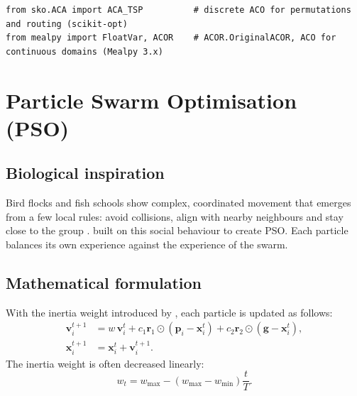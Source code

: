 \documentclass[11pt,a4paper]{article}
\newcommand{\vect}[1]{\mathbf{#1}}
\begin{document}
\begin{lstlisting}
from sko.ACA import ACA_TSP          # discrete ACO for permutations and routing (scikit-opt)
from mealpy import FloatVar, ACOR    # ACOR.OriginalACOR, ACO for continuous domains (Mealpy 3.x)
\end{lstlisting}

\section{Particle Swarm Optimisation (PSO)}
\label{sec:pso}

\subsection{Biological inspiration}

Bird flocks and fish schools show complex, coordinated movement that emerges from a few local rules: avoid collisions, align with nearby neighbours and stay close to the group \citep{reynolds1987}. \citet{kennedy1995} built on this social behaviour to create PSO. Each particle balances its own experience against the experience of the swarm.

\subsection{Mathematical formulation}

With the inertia weight introduced by \citet{shi1998}, each particle is updated as follows:
\begin{align}
  \vect{v}_i^{t+1} &= w \, \vect{v}_i^{t} + c_1 \vect{r}_1 \odot \left( \vect{p}_i - \vect{x}_i^{t} \right) + c_2 \vect{r}_2 \odot \left( \vect{g} - \vect{x}_i^{t} \right), \label{eq:pso-v} \\
  \vect{x}_i^{t+1} &= \vect{x}_i^{t} + \vect{v}_i^{t+1}.
\end{align}
The inertia weight is often decreased linearly:
\begin{equation}
  w_t = w_{\max} - \left( w_{\max} - w_{\min} \right) \frac{t}{T}.
\end{equation}
\end{document}
